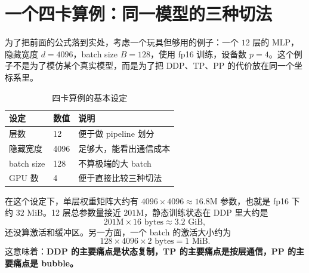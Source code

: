 \section{一个四卡算例：同一模型的三种切法}

为了把前面的公式落到实处，考虑一个玩具但够用的例子：一个 $12$ 层的 MLP，隐藏宽度 $d=4096$，batch size $B=128$，使用 fp16 训练，设备数 $p=4$。这个例子不是为了模仿某个真实模型，而是为了把 DDP、TP、PP 的代价放在同一个坐标系里。

\begin{table}[H]
\centering
\small
\begin{tabular}{p{3.1cm}p{3.7cm}p{4.2cm}}
\toprule
\textbf{设定} & \textbf{数值} & \textbf{说明} \\
\midrule
层数 & 12 & 便于做 pipeline 划分 \\
隐藏宽度 & 4096 & 足够大，能看出通信成本 \\
batch size & 128 & 不算极端的大 batch \\
GPU 数 & 4 & 便于直接比较三种切法 \\
\bottomrule
\end{tabular}
\caption{四卡算例的基本设定}
\end{table}

在这个设定下，单层权重矩阵大约有 $4096\times4096 \approx 16.8$M 参数，也就是 fp16 下约 $32$ MiB。12 层总参数量接近 $201$M，静态训练状态在 DDP 里大约是
\[
201\text{M} \times 16 \text{ bytes} \approx 3.2\text{ GiB},
\]
还没算激活和缓冲区。另一方面，一个 batch 的激活大小约为
\[
128 \times 4096 \times 2 \text{ bytes} = 1\text{ MiB}.
\]
这意味着：\textbf{DDP 的主要痛点是状态复制，TP 的主要痛点是按层通信，PP 的主要痛点是 bubble。}

\begin{table}[H]
\centering
\small
{}
\caption{同一个模型在三种切法下的直观代价}
\end{table}

